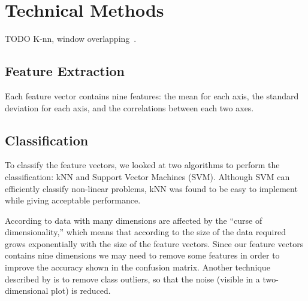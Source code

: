 \section{Technical Methods}
\label{sec:technical-methods}
TODO K-nn, window overlapping~\cite{ravi2005activity}.

\subsection{Feature Extraction}
\label{sec:feature-extraction}
Each feature vector contains nine features: the mean for each axis, the standard deviation for each axis, and the correlations between each two axes.

\subsection{Classification}
\label{sec:classification}
To classify the feature vectors, we looked at two algorithms to perform the classification: kNN and Support Vector Machines (SVM). Although SVM can efficiently classify non-linear problems, kNN was found to be easy to implement while giving acceptable performance.

According to \cite{wikipedia1} data with many dimensions are affected by the ``curse of dimensionality,'' which means that according to \cite{wikipedia2} the size of the data required grows exponentially with the size of the feature vectors. Since our feature vectors contains nine dimensions we may need to remove some features in order to improve the accuracy shown in the confusion matrix. Another technique described by \cite{wikipedia1} is to remove class outliers, so that the noise (visible in a two-dimensional plot) is reduced.
